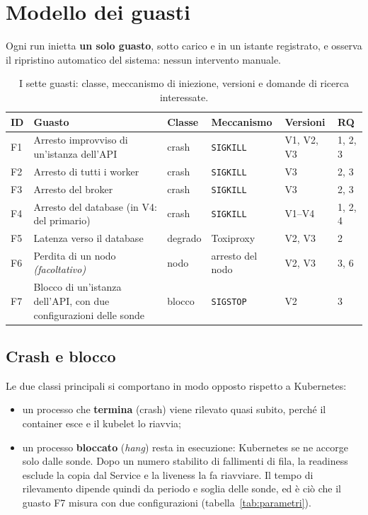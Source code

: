 \chapter{Modello dei guasti}
\label{cap:guasti}

Ogni run inietta \textbf{un solo guasto}, sotto carico e in un istante registrato, e osserva il ripristino automatico del sistema: nessun intervento manuale.

\begin{table}[htbp]
\centering
\caption{I sette guasti: classe, meccanismo di iniezione, versioni e domande di ricerca interessate.}
\label{tab:guasti}
\begin{tabularx}{\linewidth}{@{}lLllll@{}}
\toprule
\textbf{ID} & \textbf{Guasto} & \textbf{Classe} & \textbf{Meccanismo} & \textbf{Versioni} & \textbf{RQ} \\
\midrule
F1 & Arresto improvviso di un'istanza dell'API & crash & \texttt{SIGKILL} & V1, V2, V3 & 1, 2, 3 \\
F2 & Arresto di tutti i worker & crash & \texttt{SIGKILL} & V3 & 2, 3 \\
F3 & Arresto del broker & crash & \texttt{SIGKILL} & V3 & 2, 3 \\
F4 & Arresto del database (in V4: del primario) & crash & \texttt{SIGKILL} & V1--V4 & 1, 2, 4 \\
F5 & Latenza verso il database & degrado & Toxiproxy & V2, V3 & 2 \\
F6 & Perdita di un nodo \textit{(facoltativo)} & nodo & arresto del nodo & V2, V3 & 3, 6 \\
F7 & Blocco di un'istanza dell'API, con due configurazioni delle sonde & blocco & \texttt{SIGSTOP} & V2 & 3 \\
\bottomrule
\end{tabularx}
\end{table}

\section{Crash e blocco}

Le due classi principali si comportano in modo opposto rispetto a Kubernetes:

\begin{itemize}
  \item un processo che \textbf{termina} (crash) viene rilevato quasi subito, perché il container esce e il kubelet lo riavvia;
  \item un processo \textbf{bloccato} (\textit{hang}) resta in esecuzione: Kubernetes se ne accorge solo dalle sonde. Dopo un numero stabilito di fallimenti di fila, la readiness esclude la copia dal Service e la liveness la fa riavviare. Il tempo di rilevamento dipende quindi da periodo e soglia delle sonde, ed è ciò che il guasto F7 misura con due configurazioni (tabella~\ref{tab:parametri}).
\end{itemize}

